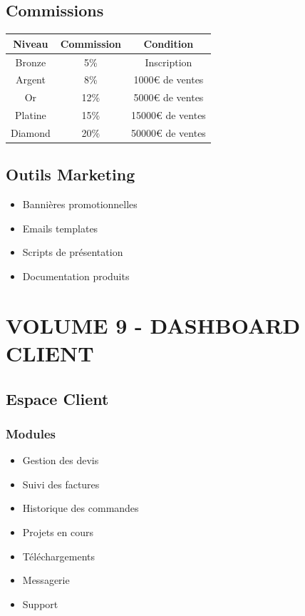 \documentclass[12pt,a4paper,oneside]{book}
\begin{document}
\chapter{Commissions}

\bigskip
\begin{center}
\begin{tabular}{|c|c|c|}
\hline
\rowcolor{electronblue}
\color{white}\textbf{Niveau} & \color{white}\textbf{Commission} & \color{white}\textbf{Condition} \\
\hline
Bronze & 5\% & Inscription \\
\hline
Argent & 8\% & 1000€ de ventes \\
\hline
Or & 12\% & 5000€ de ventes \\
\hline
Platine & 15\% & 15000€ de ventes \\
\hline
Diamond & 20\% & 50000€ de ventes \\
\hline
\end{tabular}
\end{center}

\chapter{Outils Marketing}
\begin{itemize}
\item Bannières promotionnelles
\item Emails templates
\item Scripts de présentation
\item Documentation produits
\end{itemize}

\part{VOLUME 9 - DASHBOARD CLIENT}

\chapter{Espace Client}

\section{Modules}
\begin{itemize}
\item Gestion des devis
\item Suivi des factures
\item Historique des commandes
\item Projets en cours
\item Téléchargements
\item Messagerie
\item Support
\end{itemize}
\end{document}
